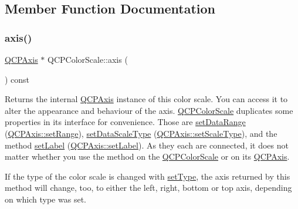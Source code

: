 \subsection{Member Function Documentation}
\mbox{\label{class_q_c_p_color_scale_a39bdbdb3b212602a5a57f9f3ea444190}} 
\subsubsection{\texorpdfstring{axis()}{axis()}}
{\footnotesize\ttfamily \mbox{\hyperlink{class_q_c_p_axis}{Q\+C\+P\+Axis}} $\ast$ Q\+C\+P\+Color\+Scale\+::axis (\begin{DoxyParamCaption}{ }\end{DoxyParamCaption}) const\hspace{0.3cm}{\ttfamily [inline]}}

Returns the internal \mbox{\hyperlink{class_q_c_p_axis}{Q\+C\+P\+Axis}} instance of this color scale. You can access it to alter the appearance and behaviour of the axis. \mbox{\hyperlink{class_q_c_p_color_scale}{Q\+C\+P\+Color\+Scale}} duplicates some properties in its interface for convenience. Those are \mbox{\hyperlink{class_q_c_p_color_scale_abe88633003a26d1e756aa74984587fef}{set\+Data\+Range}} (\mbox{\hyperlink{class_q_c_p_axis_aebdfea5d44c3a0ad2b4700cd4d25b641}{Q\+C\+P\+Axis\+::set\+Range}}), \mbox{\hyperlink{class_q_c_p_color_scale_aeb6107d67dd7325145b2498abae67fc3}{set\+Data\+Scale\+Type}} (\mbox{\hyperlink{class_q_c_p_axis_adef29cae617af4f519f6c40d1a866ca6}{Q\+C\+P\+Axis\+::set\+Scale\+Type}}), and the method \mbox{\hyperlink{class_q_c_p_color_scale_aee124ae8396320cacf8276e9a0fbb8ce}{set\+Label}} (\mbox{\hyperlink{class_q_c_p_axis_a33bcc382c111c9f31bb0687352a2dea4}{Q\+C\+P\+Axis\+::set\+Label}}). As they each are connected, it does not matter whether you use the method on the \mbox{\hyperlink{class_q_c_p_color_scale}{Q\+C\+P\+Color\+Scale}} or on its \mbox{\hyperlink{class_q_c_p_axis}{Q\+C\+P\+Axis}}.

If the type of the color scale is changed with \mbox{\hyperlink{class_q_c_p_color_scale_a1bf9bdb291927c422dd66b404b206f1f}{set\+Type}}, the axis returned by this method will change, too, to either the left, right, bottom or top axis, depending on which type was set. \mbox{\label{class_q_c_p_color_scale_a556adc6b0216ebc1cc4317c541956d06}} 
